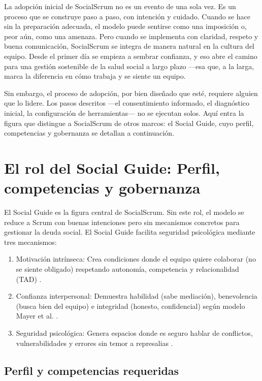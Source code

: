 La adopción inicial de SocialScrum no es un evento de una sola vez. Es un proceso que se construye paso a paso, con intención y cuidado. Cuando se hace sin la preparación adecuada, el modelo puede sentirse como una imposición o, peor aún, como una amenaza. Pero cuando se implementa con claridad, respeto y buena comunicación, SocialScrum se integra de manera natural en la cultura del equipo. Desde el primer día se empieza a sembrar confianza, y eso abre el camino para una gestión sostenible de la salud social a largo plazo ---esa que, a la larga, marca la diferencia en cómo trabaja y se siente un equipo.

Sin embargo, el proceso de adopción, por bien diseñado que esté, requiere alguien que lo lidere. Los pasos descritos ---el consentimiento informado, el diagnóstico inicial, la configuración de herramientas--- no se ejecutan solos. Aquí entra la figura que distingue a SocialScrum de otros marcos: el Social Guide, cuyo perfil, competencias y gobernanza se detallan a continuación.

\section{El rol del Social Guide: Perfil, competencias y gobernanza}

El Social Guide es la figura central de SocialScrum. Sin este rol, el modelo se reduce a Scrum con buenas intenciones pero sin mecanismos concretos para gestionar la deuda social. El Social Guide facilita seguridad psicológica mediante tres mecanismos:

\begin{enumerate}
    \item Motivación intrínseca: Crea condiciones donde el equipo quiere colaborar (no se siente obligado) respetando autonomía, competencia y relacionalidad (TAD) \cite{ryan2000self}.
    \item Confianza interpersonal: Demuestra habilidad (sabe mediación), benevolencia (busca bien del equipo) e integridad (honesto, confidencial) según modelo Mayer et al. \cite{mayer1995integrative}.
    \item Seguridad psicológica: Genera espacios donde es seguro hablar de conflictos, vulnerabilidades y errores sin temor a represalias \cite{edmondson2018fearless}.
\end{enumerate}

\subsection{Perfil y competencias requeridas}

